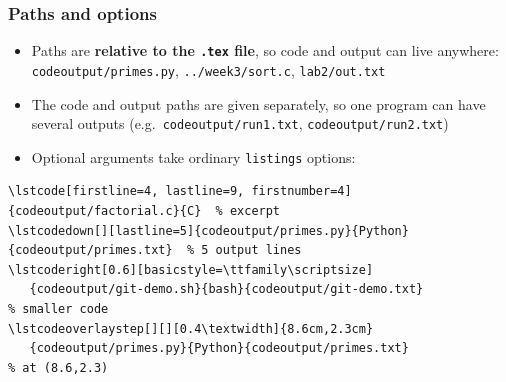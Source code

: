 \documentclass[aspectratio=169,10pt,compress]{beamer}
\begin{document}
\begin{frame}[t,fragile] \frametitle{Paths and options}
  \begin{itemize}\small
    \item Paths are \textbf{relative to the \texttt{.tex} file}, so code and output can live
          anywhere: \texttt{codeoutput/primes.py}, \texttt{../week3/sort.c}, \texttt{lab2/out.txt}
    \item The code and output paths are given separately, so one program can have
          several outputs (e.g.\ \texttt{codeoutput/run1.txt}, \texttt{codeoutput/run2.txt})
    \item Optional arguments take ordinary \texttt{listings} options:
  \end{itemize}


\begin{lstlisting}[language={[LaTeX]TeX}, basicstyle=\ttfamily\scriptsize, frame=single,
                   backgroundcolor=\color{codebg}, rulecolor=\color{gray!40}]
\lstcode[firstline=4, lastline=9, firstnumber=4]{codeoutput/factorial.c}{C}  % excerpt
\lstcodedown[][lastline=5]{codeoutput/primes.py}{Python}{codeoutput/primes.txt}  % 5 output lines
\lstcoderight[0.6][basicstyle=\ttfamily\scriptsize]
   {codeoutput/git-demo.sh}{bash}{codeoutput/git-demo.txt}                       % smaller code
\lstcodeoverlaystep[][][0.4\textwidth]{8.6cm,2.3cm}
   {codeoutput/primes.py}{Python}{codeoutput/primes.txt}                         % at (8.6,2.3)
\end{lstlisting}


\end{frame}
\end{document}
